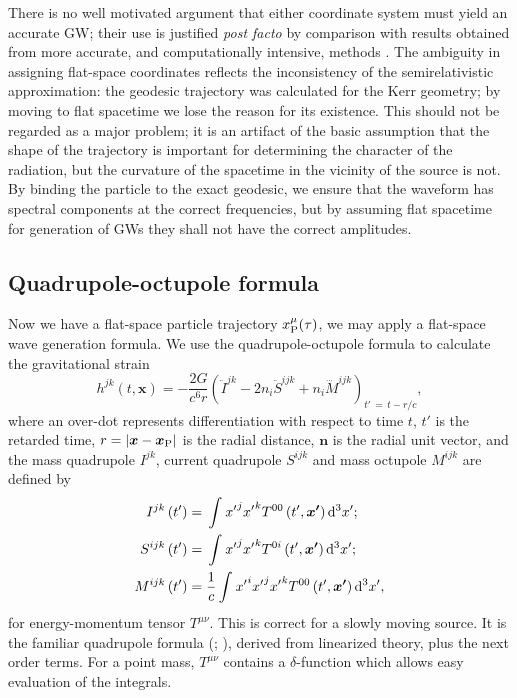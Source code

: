 There is no well motivated argument that either coordinate system must yield an accurate GW; their use is justified {\it post facto} by comparison with results obtained from more accurate, and computationally intensive, methods \citep{Gair2005, Babak2007}. The ambiguity in assigning flat-space coordinates reflects the inconsistency of the semirelativistic approximation: the geodesic trajectory was calculated for the Kerr geometry; by moving to flat spacetime we lose the reason for its existence. This should not be regarded as a major problem; it is an artifact of the basic assumption that the shape of the trajectory is important for determining the character of the radiation, but the curvature of the spacetime in the vicinity of the source is not. By binding the particle to the exact geodesic, we ensure that the waveform has spectral components at the correct frequencies, but by assuming flat spacetime for generation of GWs they shall not have the correct amplitudes.

\subsection{Quadrupole-octupole formula}

Now we have a flat-space particle trajectory $x_\mathrm{P}^\mu(\tau)$, we may apply a flat-space wave generation formula. We use the quadrupole-octupole formula to calculate the gravitational strain \citep{Bekenstein1973, Press1977, Yunes2008}
\begin{equation}
h^{jk}(t, \boldsymbol{x}) = -\frac{2G}{c^6r}\left(\ddot{I}^{jk} - 2n_i\ddot{S}^{ijk} + n_i\dddot{M}^{ijk}\right)_{t'\, =\, t - r/c},
\label{eq:octupole}
\end{equation}
where an over-dot represents differentiation with respect to time $t$, $t'$ is the retarded time, $r = \left|\boldsymbol{x} - \boldsymbol{x}_\mathrm{P}\right|$ is the radial distance, $\boldsymbol{n}$ is the radial unit vector, and the mass quadrupole ${I}^{jk}$, current quadrupole ${S}^{ijk}$ and mass octupole ${M}^{ijk}$ are defined by
\begin{subequations}
\begin{align}
{I}^{jk}\left(t'\right) = {} & \int_{}^{}{{x'}^j{x'}^kT^{00}\left(t', \boldsymbol{x'}\right) }\,\mathrm{d}{^3x'};\\
{S}^{ijk}\left(t'\right) = {} & \int_{}^{}{{x'}^j{x'}^kT^{0i}\left(t', \boldsymbol{x'}\right)}\,\mathrm{d}{^3x'};\\
{M}^{ijk}\left(t'\right)  = {} & \frac{1}{c}\int_{}^{}{{x'}^i{x'}^j{x'}^kT^{00}\left(t', \boldsymbol{x'}\right)}\,\mathrm{d}{^3x'},
\end{align}
\end{subequations}
for energy-momentum tensor $T^{\mu\nu}$. This is correct for a slowly moving source. It is the familiar quadrupole formula \linebreak[0] (\citealt[section 36.10]{Misner1973}; \citealt[section 17.9]{Hobson2006}), derived from linearized theory, plus the next order terms. For a point mass, $T^{\mu\nu}$ contains a $\delta$-function which allows easy evaluation of the integrals.

